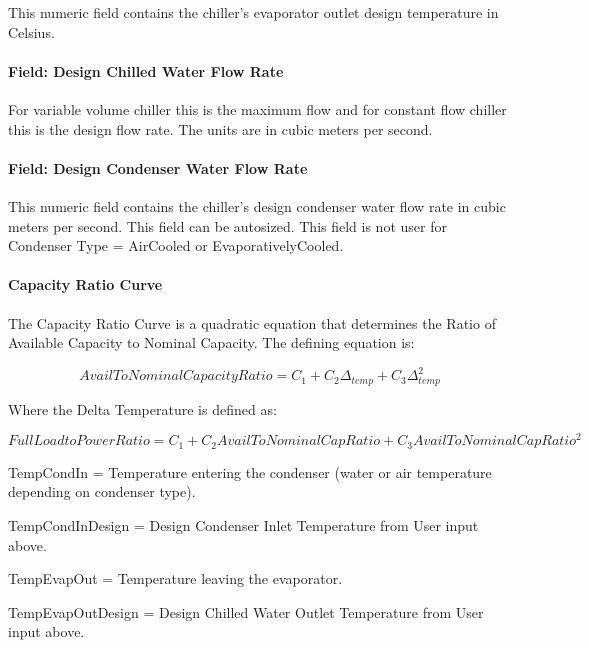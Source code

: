 This numeric field contains the chiller's evaporator outlet design temperature in Celsius.

\paragraph{Field: Design Chilled Water Flow Rate}\label{field-design-chilled-water-flow-rate-4}

For variable volume chiller this is the maximum flow and for constant flow chiller this is the design flow rate. The units are in cubic meters per second.

\paragraph{Field: Design Condenser Water Flow Rate}\label{field-design-condenser-water-flow-rate-3}

This numeric field contains the chiller's design condenser water flow rate in cubic meters per second. This field can be autosized. This field is not user for Condenser Type = AirCooled or EvaporativelyCooled.

\paragraph{Capacity Ratio Curve}\label{capacity-ratio-curve-1}

The Capacity Ratio Curve is a quadratic equation that determines the Ratio of Available Capacity to Nominal Capacity. The defining equation is:

\begin{equation}
AvailToNominalCapacityRatio = {C_1} + {C_2}{\Delta_{temp}} + {C_3}\Delta_{temp}^2
\end{equation}

Where the Delta Temperature is defined as:

\begin{equation}
FullLoadtoPowerRatio = {C_1} + {C_2}AvailToNominalCapRatio + {C_3}AvailToNominalCapRati{o^2}
\end{equation}

TempCondIn = Temperature entering the condenser (water or air temperature depending on condenser type).

TempCondInDesign = Design Condenser Inlet Temperature from User input above.

TempEvapOut = Temperature leaving the evaporator.

TempEvapOutDesign = Design Chilled Water Outlet Temperature from User input above.


